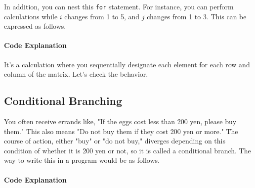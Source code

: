 \documentclass{ltjsbook}
\begin{document}
In addition, you can nest this \verb|for| statement. For instance, you can perform calculations while $i$ changes from 1 to 5, and $j$ changes from 1 to 3. This can be expressed as follows.


\paragraph{Code Explanation}


It's a calculation where you sequentially designate each element for each row and column of the matrix. Let's check the behavior.

\subsection{Conditional Branching}
\label{if_statement}
You often receive errands like, "If the eggs cost less than 200 yen, please buy them." This also means "Do not buy them if they cost 200 yen or more." The course of action, either "buy" or "do not buy," diverges depending on this condition of whether it is 200 yen or not, so it is called a conditional branch. The way to write this in a program would be as follows.

\paragraph{Code Explanation}

\end{document}
